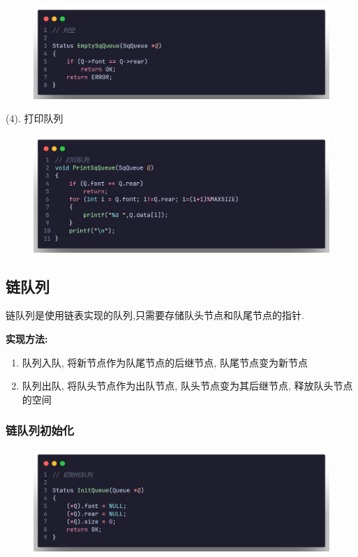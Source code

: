 \begin{figure}[H]
    \centering
    \includegraphics[scale=0.2]{"figure/Note/Stack/QEmpty.png"}
\end{figure}

(4). 打印队列

\begin{figure}[H]
    \centering
    \includegraphics[scale=0.2]{"figure/Note/Stack/QPrint.png"}
\end{figure}

\subsection{链队列}
\begin{definition}[链队列]
    链队列是使用链表实现的队列,只需要存储队头节点和队尾节点的指针.

    \textbf{实现方法:}
    \begin{enumerate}
        \item 队列入队, 将新节点作为队尾节点的后继节点, 队尾节点变为新节点
        \item 队列出队, 将队头节点作为出队节点, 队头节点变为其后继节点, 释放队头节点的空间
    \end{enumerate}
\end{definition}
\subsubsection{链队列初始化}

\begin{figure}[H]
    \centering
    \includegraphics[scale=0.2]{"figure/Note/Stack/QlInit.png"}
\end{figure}

